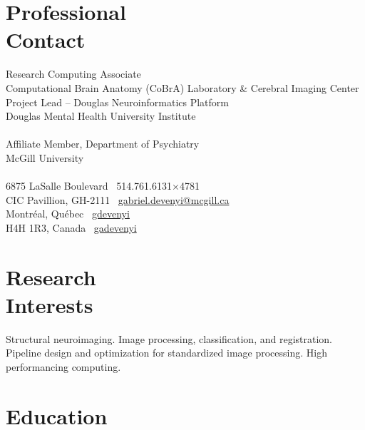 \documentclass[margin1,line,canadian]{resume}
\begin{document}
\begin{resume}
 \section{\mysidestyle Professional\\Contact}
 Research Computing Associate\\
 Computational Brain Anatomy (CoBrA) Laboratory \& Cerebral Imaging Center\\
 Project Lead -- Douglas Neuroinformatics Platform\\
 Douglas Mental Health University Institute\\
 \\
 Affiliate Member, Department of Psychiatry\\
 McGill University\\
 \\
 6875 LaSalle Boulevard \hfill \faPhone~514.761.6131$\times$4781\\
 CIC Pavillion, GH-2111 \hfill \faEnvelope~\href{mailto:gabriel.devenyi@mcgill.ca}{gabriel.devenyi@mcgill.ca}\\
 Montr\'{e}al, Qu\'{e}bec \hfill \faGithub~\href{https://github.com/gdevenyi}{gdevenyi}\\
 H4H 1R3, Canada \hfill \faTwitter~\href{https://twitter.com/gadevenyi}{gadevenyi}\\
 \vspace{-4.5mm}%

 \section{\mysidestyle Research\\Interests}

 Structural neuroimaging. Image processing, classification, and registration. Pipeline design and optimization
 for standardized image processing. High performancing computing.

 \section{\mysidestyle Education}


\end{resume}
\end{document}
